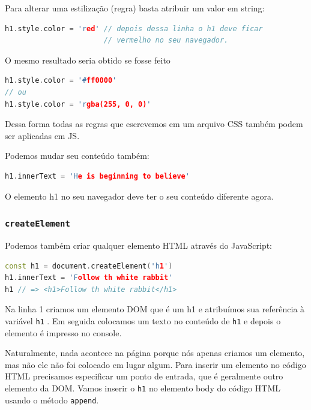 Para alterar uma estilização (regra) basta atribuir um valor em string:\\


\begin{lstlisting}[language=C++]
h1.style.color = 'red' // depois dessa linha o h1 deve ficar 
                       // vermelho no seu navegador.
\end{lstlisting}

\hfill

O mesmo resultado seria obtido se fosse feito\\

\begin{lstlisting}[language=C++]
h1.style.color = '#ff0000' 
// ou
h1.style.color = 'rgba(255, 0, 0)'
\end{lstlisting}

\hfill


Dessa forma todas as regras que escrevemos em um arquivo CSS também podem ser aplicadas em JS.

Podemos mudar seu conteúdo também:\\

\begin{lstlisting}[language=C++]
h1.innerText = 'He is beginning to believe'
\end{lstlisting}
\hfill

O elemento h1 no seu navegador deve ter o seu conteúdo diferente agora.

\newpage
\subsubsection{ \texttt{createElement} }
Podemos também criar qualquer elemento HTML através do JavaScript: \\

\begin{lstlisting}[language=C++]
const h1 = document.createElement('h1')
h1.innerText = 'Follow th white rabbit'
h1 // => <h1>Follow th white rabbit</h1>
\end{lstlisting}
\hfill

Na linha 1 criamos um elemento DOM que é um h1 e atribuímos sua referência à variável \texttt{h1}
. Em seguida colocamos um texto no conteúdo de \texttt{h1} e depois o elemento é impresso no console.

Naturalmente, nada acontece na página porque nós apenas criamos um elemento, mas não ele não foi colocado em lugar algum. Para inserir um elemento no código HTML precisamos especificar um ponto de entrada, que é geralmente outro elemento da DOM. Vamos inserir o \texttt{h1} no elemento body do código HTML usando o método \texttt{append}.\\

